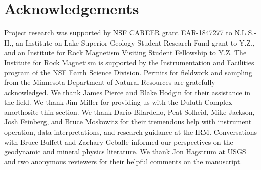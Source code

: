 \section{Acknowledgements}

Project research was supported by NSF CAREER grant EAR-1847277 to N.L.S.-H., an Institute on Lake Superior Geology Student Research Fund grant to Y.Z., and an Institute for Rock Magnetism Visiting Student Fellowship to Y.Z. The Institute for Rock Magnetism is supported by the Instrumentation and Facilities program of the NSF Earth Science Division. Permits for fieldwork and sampling from the Minnesota Department of Natural Resources are gratefully acknowledged. We thank James Pierce and Blake Hodgin for their assistance in the field. We thank Jim Miller for providing us with the Duluth Complex anorthosite thin section. We thank Dario Bilardello, Peat Solheid, Mike Jackson, Josh Feinberg, and Bruce Moskowitz for their tremendous help with instrument operation, data interpretations, and research guidance at the IRM. Conversations with Bruce Buffett and Zachary Geballe informed our perspectives on the geodynamic and mineral physics literature. We thank Jon Hagstrum at USGS and two anonymous reviewers for their helpful comments on the manuscript.

